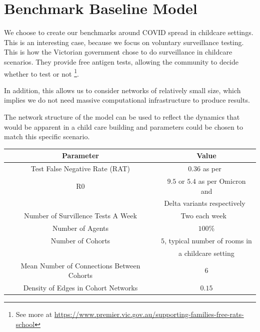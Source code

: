\documentclass{article}
\begin{document}
\newpage
\section{Benchmark Baseline Model}

We choose to create our benchmarks around COVID spread in childcare settings. 
This is an interesting case, because we focus on voluntary surveillance testing. This is how the Victorian government chose to do surveillance in childcare scenarios. They provide free antigen tests, allowing the community to decide whether to test or not \footnote{See more at \url{https://www.premier.vic.gov.au/supporting-families-free-rats-school}}.

In addition, this allows us to consider networks of relatively small size, which implies we do not need massive computational infrastructure to produce results. \newline 


The network structure of the model can be used to reflect the dynamics that would be apparent in a child care building and parameters could be chosen to match this specific scenario.\newline

\begin{tabular}{|c|c|}
\hline
\textbf{Parameter} & \textbf{Value} \\ \hline
Test False Negative Rate (RAT) & $0.36$ as per~\cite{van_de_mortel_2022} \\ \hline
R0 &  $9.5$ or $5.4$ as per Omicron and  \\
&  Delta variants respectively~\cite{liu_rocklov_2022} \\ \hline
Number of Survillence Tests A Week&  Two each week ~\cite{premier_of_victoria_2022} \\ \hline
Number of Agents & $100$\% \\ \hline
Number of Cohorts & $5$, typical number of rooms in  \\ 
& a childcare setting \\\hline
Mean Number of Connections Between Cohorts  & $6$ \\ \hline
Density of Edges in Cohort Networks  & $0.15$ \\ \hline
\end{tabular}
\newline
\end{document}
